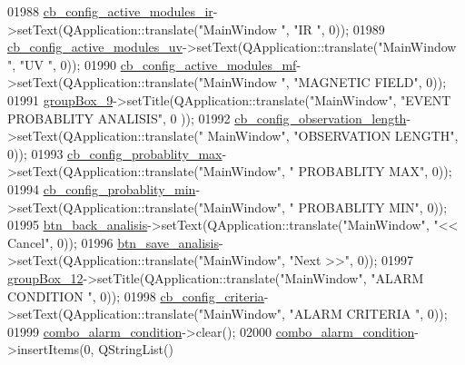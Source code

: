 \begin{DoxyCode}
01988         \hyperlink{a00027_abef4ef3d5d03026de5d5e172eb0335a6}{cb\_config\_active\_modules\_ir}->setText(QApplication::translate(\textcolor{stringliteral}{"MainWindow
      "}, \textcolor{stringliteral}{"IR                "}, 0));
01989         \hyperlink{a00027_a72ad8a6b100948f9b1438cf3b949be5e}{cb\_config\_active\_modules\_uv}->setText(QApplication::translate(\textcolor{stringliteral}{"MainWindow
      "}, \textcolor{stringliteral}{"UV            "}, 0));
01990         \hyperlink{a00027_abc96d02b5b7a9480a2a142008e99a100}{cb\_config\_active\_modules\_mf}->setText(QApplication::translate(\textcolor{stringliteral}{"MainWindow
      "}, \textcolor{stringliteral}{"MAGNETIC FIELD"}, 0));
01991         \hyperlink{a00027_ab492988d340548c7f30e098419ef10ee}{groupBox\_9}->setTitle(QApplication::translate(\textcolor{stringliteral}{"MainWindow"}, \textcolor{stringliteral}{"EVENT PROBABLITY ANALISIS"}, 0
      ));
01992         \hyperlink{a00027_ae9e8f3f0d147a4cd21c8f36ffb3bd81f}{cb\_config\_observation\_length}->setText(QApplication::translate(\textcolor{stringliteral}{"
      MainWindow"}, \textcolor{stringliteral}{"OBSERVATION LENGTH"}, 0));
01993         \hyperlink{a00027_ad0a7ea02564c112595f0d30efa75eef2}{cb\_config\_probablity\_max}->setText(QApplication::translate(\textcolor{stringliteral}{"MainWindow"}, \textcolor{stringliteral}{"
      PROBABLITY MAX"}, 0));
01994         \hyperlink{a00027_a6e32cc42adcf308df94cbbc9ac226f50}{cb\_config\_probablity\_min}->setText(QApplication::translate(\textcolor{stringliteral}{"MainWindow"}, \textcolor{stringliteral}{"
      PROBABLITY MIN"}, 0));
01995         \hyperlink{a00027_a5704296b847187d5975858d04c8c2513}{btn\_back\_analisis}->setText(QApplication::translate(\textcolor{stringliteral}{"MainWindow"}, \textcolor{stringliteral}{"<< Cancel"}, 0));
01996         \hyperlink{a00027_a231adeaeca96ac21170495bfb1422e5e}{btn\_save\_analisis}->setText(QApplication::translate(\textcolor{stringliteral}{"MainWindow"}, \textcolor{stringliteral}{"Next >>"}, 0));
01997         \hyperlink{a00027_af55cd87dbe0f7d42980b1012f15cae2d}{groupBox\_12}->setTitle(QApplication::translate(\textcolor{stringliteral}{"MainWindow"}, \textcolor{stringliteral}{"ALARM CONDITION "}, 0));
01998         \hyperlink{a00027_a89574c631636929702a5928b2a159892}{cb\_config\_criteria}->setText(QApplication::translate(\textcolor{stringliteral}{"MainWindow"}, \textcolor{stringliteral}{"ALARM CRITERIA
      "}, 0));
01999         \hyperlink{a00027_a2af463e4a88fddd219f2e41a386fbd68}{combo\_alarm\_condition}->clear();
02000         \hyperlink{a00027_a2af463e4a88fddd219f2e41a386fbd68}{combo\_alarm\_condition}->insertItems(0, QStringList()

\end{DoxyCode}
